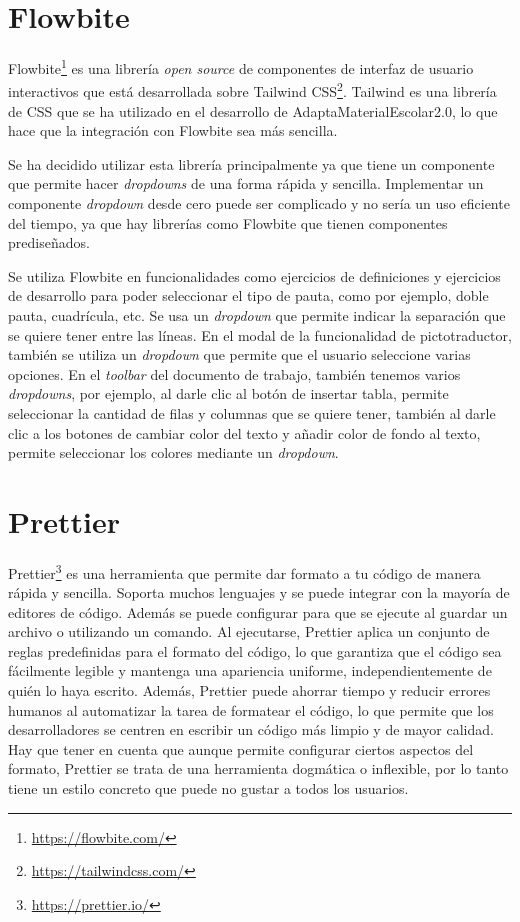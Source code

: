 \section{Flowbite}\label{sec:Flowbite}
Flowbite\footnote{\url{https://flowbite.com/}} es una librería \textit{open source} de componentes de interfaz de usuario interactivos que está desarrollada sobre Tailwind CSS\footnote{\url{https://tailwindcss.com/}}. Tailwind es una librería de CSS que se ha utilizado en el desarrollo de AdaptaMaterialEscolar2.0, lo que hace que la integración con Flowbite sea más sencilla.

Se ha decidido utilizar esta librería principalmente ya que tiene un componente que permite hacer \textit{dropdowns} de una forma rápida y sencilla. Implementar un componente \textit{dropdown} desde cero puede ser complicado y no sería un uso eficiente del tiempo, ya que hay librerías como Flowbite que tienen componentes prediseñados.

Se utiliza Flowbite en funcionalidades como ejercicios de definiciones y ejercicios de desarrollo para poder seleccionar el tipo de pauta, como por ejemplo, doble pauta, cuadrícula, etc. Se usa un \textit{dropdown} que permite indicar la separación que se quiere tener entre las líneas. En el modal de la funcionalidad de pictotraductor, también se utiliza un \textit{dropdown} que permite que el usuario seleccione varias opciones. En el \textit{toolbar} del documento de trabajo, también tenemos varios \textit{dropdowns}, por ejemplo, al darle clic al botón de insertar tabla, permite seleccionar la cantidad de filas y columnas que se quiere tener, también al darle clic a los botones de cambiar color del texto y añadir color de fondo al texto, permite seleccionar los colores mediante un \textit{dropdown}.

\section{Prettier}\label{sec:prettier}
Prettier\footnote{\url{https://prettier.io/}} es una herramienta que permite dar formato a tu código de manera rápida y sencilla. Soporta muchos lenguajes y se puede integrar con la mayoría de editores de código. Además se puede configurar para que se ejecute al guardar un archivo o utilizando un comando. Al ejecutarse, Prettier aplica un conjunto de reglas predefinidas para el formato del código, lo que garantiza que el código sea fácilmente legible y mantenga una apariencia uniforme, independientemente de quién lo haya escrito. Además, Prettier puede ahorrar tiempo y reducir errores humanos al automatizar la tarea de formatear el código, lo que permite que los desarrolladores se centren en escribir un código más limpio y de mayor calidad. Hay que tener en cuenta que aunque permite configurar ciertos aspectos del formato, Prettier se trata de una herramienta dogmática o inflexible, por lo tanto tiene un estilo concreto que puede no gustar a todos los usuarios.

